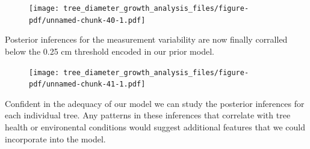 \documentclass[
  letterpaper,
  DIV=11,
  numbers=noendperiod]{scrartcl}
\newenvironment{Shaded}{\begin{snugshade}}{\end{snugshade}}
\newcommand{\AttributeTok}[1]{\textcolor[rgb]{0.40,0.45,0.13}{#1}}
\newcommand{\DecValTok}[1]{\textcolor[rgb]{0.68,0.00,0.00}{#1}}
\newcommand{\FloatTok}[1]{\textcolor[rgb]{0.68,0.00,0.00}{#1}}
\newcommand{\FunctionTok}[1]{\textcolor[rgb]{0.28,0.35,0.67}{#1}}
\newcommand{\NormalTok}[1]{\textcolor[rgb]{0.00,0.23,0.31}{#1}}
\newcommand{\OtherTok}[1]{\textcolor[rgb]{0.00,0.23,0.31}{#1}}
\newcommand{\SpecialCharTok}[1]{\textcolor[rgb]{0.37,0.37,0.37}{#1}}
\newcommand{\StringTok}[1]{\textcolor[rgb]{0.13,0.47,0.30}{#1}}
\begin{document}
\begin{figure}[H]

{\centering \texttt{[image: tree\_diameter\_growth\_analysis\_files/figure-pdf/unnamed-chunk-40-1.pdf]}

}

\end{figure}

Posterior inferences for the measurement variability are now finally
corralled below the 0.25 cm threshold encoded in our prior model.

\begin{Shaded}
\end{Shaded}

\begin{figure}[H]

{\centering \texttt{[image: tree\_diameter\_growth\_analysis\_files/figure-pdf/unnamed-chunk-41-1.pdf]}

}

\end{figure}

Confident in the adequacy of our model we can study the posterior
inferences for each individual tree. Any patterns in these inferences
that correlate with tree health or environental conditions would suggest
additional features that we could incorporate into the model.
\end{document}
